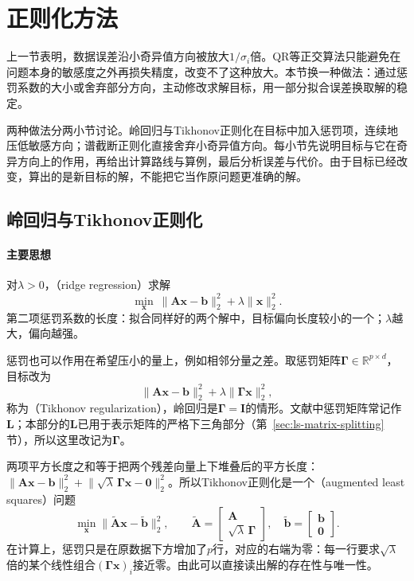 \section{正则化方法}
\label{sec:ls-truncated-svd-ridge}

上一节表明，数据误差沿小奇异值方向被放大$1/\sigma_i$倍。QR等正交算法只能避免在问题本身的敏感度之外再损失精度，改变不了这种放大。本节换一种做法：通过惩罚系数的大小或舍弃部分方向，主动修改求解目标，用一部分拟合误差换取解的稳定。

两种做法分两小节讨论。岭回归与Tikhonov正则化在目标中加入惩罚项，连续地压低敏感方向；谱截断正则化直接舍弃小奇异值方向。每小节先说明目标与它在奇异方向上的作用，再给出计算路线与算例，最后分析误差与代价。由于目标已经改变，算出的是新目标的解，不能把它当作原问题更准确的解。

\subsection{岭回归与Tikhonov正则化}
\label{sec:ls-regularized-ls}

\paragraph{主要思想}
对$\lambda>0$，（ridge regression）求解
\begin{equation}
 \min_{\bm x}\ \lVert\bm A\bm x-\bm b\rVert_2^2+\lambda\lVert\bm x\rVert_2^2 .
 \label{eq:ls-ridge-objective}
\end{equation}
第二项惩罚系数的长度：拟合同样好的两个解中，目标偏向长度较小的一个；$\lambda$越大，偏向越强。

惩罚也可以作用在希望压小的量上，例如相邻分量之差。取惩罚矩阵$\bm\Gamma\in\mathbb R^{p\times d}$，目标改为
\[
\lVert\bm A\bm x-\bm b\rVert_2^2+\lambda\lVert\bm\Gamma\bm x\rVert_2^2 ,
\]
称为（Tikhonov regularization），岭回归是$\bm\Gamma=\bm I$的情形。文献中惩罚矩阵常记作$\bm L$；本部分的$\bm L$已用于表示矩阵的严格下三角部分（第~\ref{sec:ls-matrix-splitting}节），所以这里改记为$\bm\Gamma$。

两项平方长度之和等于把两个残差向量上下堆叠后的平方长度：$\lVert\bm A\bm x-\bm b\rVert_2^2+\lVert\sqrt\lambda\,\bm\Gamma\bm x-\bm0\rVert_2^2$。所以Tikhonov正则化是一个（augmented least squares）问题
\begin{equation}
 \min_{\bm x}\lVert\tilde{\bm A}\bm x-\tilde{\bm b}\rVert_2^2,\qquad
 \tilde{\bm A}=\begin{bmatrix}\bm A\\ \sqrt\lambda\,\bm\Gamma\end{bmatrix},\quad
 \tilde{\bm b}=\begin{bmatrix}\bm b\\ \bm0\end{bmatrix}.
 \label{eq:ls-augmented-system}
\end{equation}
在计算上，惩罚只是在原数据下方增加了$p$行，对应的右端为零：每一行要求$\sqrt\lambda$倍的某个线性组合$(\bm\Gamma\bm x)_i$接近零。由此可以直接读出解的存在性与唯一性。

